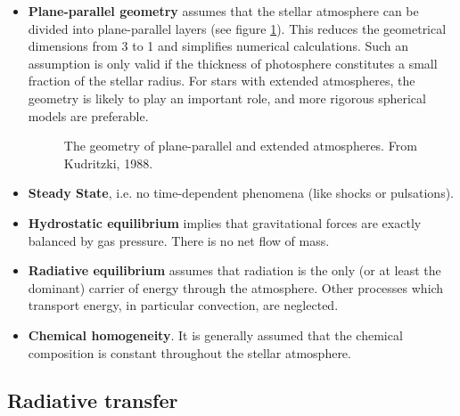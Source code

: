 \begin{itemize}

\item	\textbf{Plane-parallel geometry} assumes that the stellar
	atmosphere can be divided into plane-parallel layers (see
	figure \ref{fig:planepar}). This reduces the geometrical
	dimensions from 3 to 1 and simplifies numerical
	calculations. Such an assumption is only valid if the
	thickness of photosphere constitutes a small fraction of the
	stellar radius. For stars with extended atmospheres, the
	geometry is likely to play an important role, and more
	rigorous spherical models are preferable.

\begin{figure} %
\epsfxsize=11cm
\setlength{\cen}{(\textwidth / 2) - (\epsfxsize / 2)}
\hspace{\cen}
\caption[The geometry of plane-parallel and extended atmospheres]
{\fcfont The geometry of plane-parallel and extended atmospheres. From
Kudritzki, 1988.
}
\label{fig:planepar}
\end{figure}   %

\item 	\textbf{Steady State}, i.e. no time-dependent phenomena (like
	shocks or pulsations). 

\item	\textbf{Hydrostatic equilibrium} implies that gravitational
	forces are exactly balanced by gas pressure. There is no net
	flow of mass.

\item	\textbf{Radiative equilibrium} assumes that radiation is the
	only (or at least the dominant) carrier of energy through the
	atmosphere. Other processes which transport energy, in particular
	convection, are neglected.

\item	\textbf{Chemical homogeneity}. It is generally assumed that
	the chemical composition is constant throughout the stellar
	atmosphere. 

\end{itemize}

\subsection{Radiative transfer}

